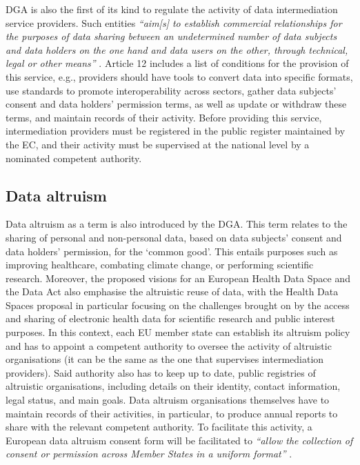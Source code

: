 DGA is also the first of its kind to regulate the activity of data intermediation service providers.
Such entities \textit{``aim[s] to establish commercial relationships for the purposes of data sharing between an undetermined number of data subjects and data holders on the one hand and data users on the other, through technical, legal or other means''} \citeyearpar{noauthor_regulation_2022}.
Article 12 includes a list of conditions for the provision of this service, e.g., providers should have tools to convert data into specific formats, use standards to promote interoperability across sectors, gather data subjects' consent and data holders' permission terms, as well as update or withdraw these terms, and maintain records of their activity.
Before providing this service, intermediation providers must be registered in the public register maintained by the EC, and their activity must be supervised at the national level by a nominated competent authority.

\subsection{Data altruism}
\label{sec:altruism}

Data altruism as a term is also introduced by the DGA.
This term relates to the sharing of personal and non-personal data, based on data subjects' consent and data holders' permission, for the `common good'.
This entails purposes such as improving healthcare, combating climate change, or performing scientific research.
Moreover, the proposed visions for an European Health Data Space \citeyearpar{noauthor_proposal_2022} and the Data Act \citeyearpar{noauthor_dataact_2022} also emphasise the altruistic reuse of data, with the Health Data Spaces proposal in particular focusing on the challenges brought on by the access and sharing of electronic health data for scientific research and public interest purposes.
In this context, each EU member state can establish its altruism policy and has to appoint a competent authority to oversee the activity of altruistic organisations (it can be the same as the one that supervises intermediation providers).
Said authority also has to keep up to date, public registries of altruistic organisations, including details on their identity, contact information, legal status, and main goals.
Data altruism organisations themselves have to maintain records of their activities, in particular, to produce annual reports to share with the relevant competent authority.
To facilitate this activity, a European data altruism consent form will be facilitated  to \textit{``allow the collection of consent or permission across Member States in a uniform format''} \citeyearpar{noauthor_regulation_2022}.

